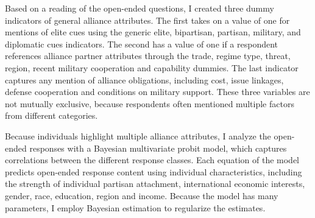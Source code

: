 \documentclass[12pt]{article}
\begin{document}
Based on a reading of the open-ended questions, I created three dummy indicators of general alliance attributes. 
The first takes on a value of one for mentions of elite cues using the generic elite, bipartisan, partisan, military, and diplomatic cues indicators. 
The second has a value of one if a respondent references alliance partner attributes through the trade, regime type, threat, region, recent military cooperation and capability dummies. 
The last indicator captures any mention of alliance obligations, including cost, issue linkages, defense cooperation and conditions on military support. 
These three variables are not mutually exclusive, because respondents often mentioned multiple factors from different categories. 


Because individuals highlight multiple alliance attributes, I analyze the open-ended responses with a Bayesian multivariate probit model, which captures correlations between the different response classes. 
Each equation of the model predicts open-ended response content using individual characteristics, including the strength of individual partisan attachment, international economic interests, gender, race, education, region and income. 
Because the model has many parameters, I employ Bayesian estimation to regularize the estimates. 


\newpage

 
 
\end{document}
